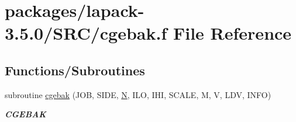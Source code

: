 \hypertarget{cgebak_8f}{}\section{packages/lapack-\/3.5.0/\+S\+R\+C/cgebak.f File Reference}
\label{cgebak_8f}
\subsection*{Functions/\+Subroutines}
\begin{DoxyCompactItemize}
\item 
subroutine \hyperlink{group__complexGEcomputational_ga7b18618f418e36eb2d8cfa0cae8fed3b}{cgebak} (J\+O\+B, S\+I\+D\+E, \hyperlink{polmisc_8c_a0240ac851181b84ac374872dc5434ee4}{N}, I\+L\+O, I\+H\+I, S\+C\+A\+L\+E, M, V, L\+D\+V, I\+N\+F\+O)
\begin{DoxyCompactList}\small\item\em {\bfseries C\+G\+E\+B\+A\+K} \end{DoxyCompactList}\end{DoxyCompactItemize}
